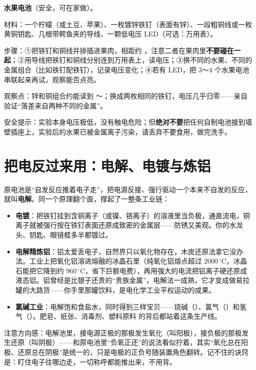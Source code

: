 \begin{shiyan}
\textbf{水果电池}（安全，可在家做）。

材料：一个柠檬（或土豆、苹果）、一枚镀锌铁钉（表面有锌）、一段粗铜线或一枚黄铜钥匙、几根带鳄鱼夹的导线、一颗低电压 LED（可选：万用表）。

步骤：①把铁钉和铜线并排插进果肉，相距约 ，注意二者在果肉里\textbf{不要碰在一起}；②用导线把铁钉和铜线分别连到万用表上，读电压；③换不同的水果、不同的金属组合（比如铁钉配铁钉），记录电压变化；④若有 LED，把 3～4 个水果电池串联起来再试，观察能否点亮。

观察点：锌和铜组合约能读到 ～；换成两枚相同的铁钉，电压几乎归零——亲自验证“落差来自两种不同的金属”。

安全提示：实验本身电压极低，没有触电危险；但\textbf{绝对不要}把任何自制电池接到墙壁插座上，实验后的水果已被金属离子污染，请丢弃不要食用，做完洗手。
\end{shiyan}

\section{把电反过来用：电解、电镀与炼铝}

原电池是“自发反应推着电子走”，把电源反接、强行驱动一个本来不自发的反应，就叫\textbf{电解}。同一个原理翻个面，撑起了一整条工业链：

\begin{itemize}[itemsep=2pt]
\item \textbf{电镀}：把铁钉挂到含铜离子（或镍、铬离子）的溶液里当负极，通直流电，铜离子就被强行按在铁钉表面还原成致密的金属层——防锈又美观。你的水龙头、钥匙、眼镜框多半都镀过。
\item \textbf{电解精炼铝}：铝太爱丢电子，自然界只以氧化物存在，木炭还原法拿它没办法。工业上把氧化铝溶进熔融的冰晶石里（纯氧化铝熔点超过 $2000\,^{\circ}\mathrm{C}$，冰晶石能把它降到约 $960\,^{\circ}\mathrm{C}$，省下巨额电费），再用强大的电流把铝离子硬还原成液态铝。铝曾经是比银子还贵的“贵族金属”，电解法一成熟，它才变成做易拉罐的大路货——你手里那罐饮料，是电化学工业平权运动的成果。
\item \textbf{氯碱工业}：电解饱和食盐水，同时得到三样宝贝——烧碱（）、氯气（）和氢气（）。肥皂、纸张、消毒剂、塑料原料  的背后都站着这条生产线。
\end{itemize}

注意方向感：电解池里，接电源正极的那极发生氧化（叫阳极），接负极的那极发生还原（叫阴极）——和原电池里“负氧正还”的说法看似拧着，其实“氧化总在阳极、还原总在阴极”是统一的，只是电极的正负号随装置角色翻转。记不住的诀窍是：盯住电子往哪边走，一切称呼都能推出来，不用背。


